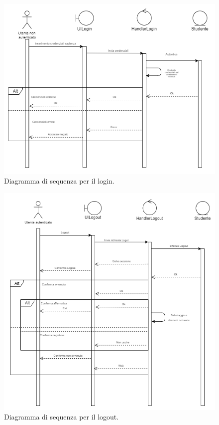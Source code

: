  \begin{figure}[H]
\begin{center}
  \includegraphics[width=1 \textwidth]{Figure/sequence login.png}
    \caption{Diagramma di sequenza per il login.}\label{figura: login}
\end{center}
\end{figure}


 \begin{figure}[H]
\begin{center}
  \includegraphics[width=1 \textwidth]{Figure/sequence logout.png}
    \caption{Diagramma di sequenza per il logout.}\label{figura: logout}
\end{center}
\end{figure}

